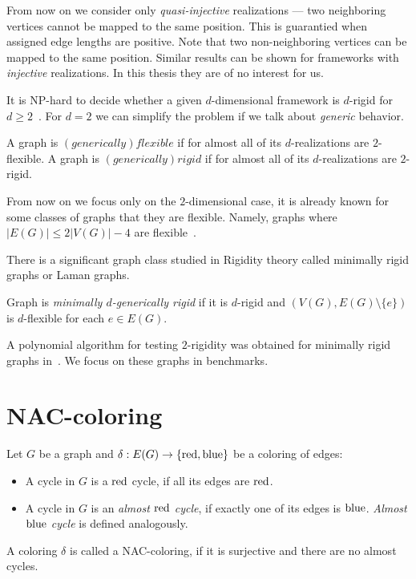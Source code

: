 From now on we consider only \emph{quasi-injective} realizations ---
two neighboring vertices cannot be mapped to the same position.
This is guarantied when assigned edge lengths are positive.
Note that two non-neighboring vertices can be mapped to the same position.
Similar results can be shown for frameworks with \emph{injective} realizations.
In this thesis they are of no interest for us.

It is NP-hard to decide whether a given \( d \)-dimensional framework is
\( d \)-rigid for \( d \ge 2 \)~\cite{d_rigidity_hardness}.
For \( d = 2 \) we can simplify the problem if we talk about \emph{generic}
behavior.
%
\begin{definition}
	A graph is \( (generically) flexible \) if for almost all of
	its \( d \)-realizations are \( 2 \)-flexible.
	A graph is \( (generically) rigid \) if for almost all of
	its \( d \)-realizations are \( 2 \)-rigid.
\end{definition}
%

From now on we focus only on the \( 2 \)-dimensional case,
it is already known for some classes of graphs that they are flexible.
Namely, graphs where \( |E(G)| \le 2|V(G)| - 4 \)
are flexible~\cite{stable_cuts_2v_4}.

There is a significant graph class studied in Rigidity theory
called minimally rigid graphs or Laman graphs.
%
\begin{definition}
	Graph is \emph{minimally \( d \)-generically rigid} if it is \( d \)-rigid
	and \( (V(G), E(G) \setminus \{e\}) \) is \(d\)-flexible for each \( e \in E(G) \).
\end{definition}
%

A polynomial algorithm for testing \( 2 \)-rigidity was obtained
for minimally rigid graphs in~\cite{polynomial-min-rigid}.
We focus on these graphs in benchmarks.

\section{NAC-coloring}

\begin{definition}
	Let \( G \) be a graph and \( \delta: E(G) \to \{ \text{red}, \text{blue} \} \)
	be a coloring of edges:
	\begin{itemize}
		\item A cycle in \( G \) is a \( \text{red} \) cycle, if all its edges are \( \text{red} \).
		\item A cycle in \( G \) is an \emph{almost \( \text{red} \) cycle},
		      if exactly one of its edges is \( \text{blue} \).
		      \emph{Almost \( \text{blue} \) cycle} is defined analogously.
	\end{itemize}
	A coloring \( \delta \) is called a NAC-coloring, if it is surjective
	and there are no almost cycles.
\end{definition}
%

